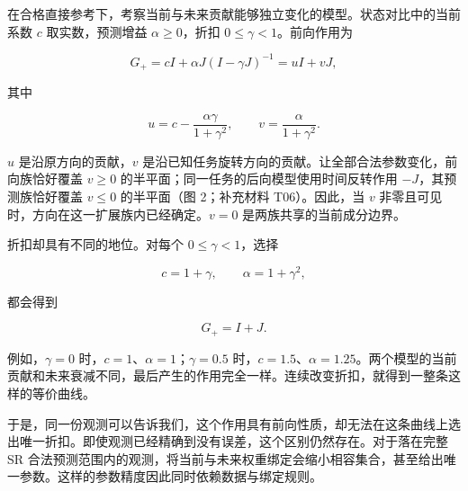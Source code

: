\documentclass[11pt,a4paper]{article}
\begin{document}
\par
\noindent\begin{minipage}{\linewidth}

在合格直接参考下，考察当前与未来贡献能够独立变化的模型。状态对比中的当前系数
\(c\) 取实数，预测增益 \(\alpha\geq0\)，折扣
\(0\leq\gamma<1\)。前向作用为

\[
G_+=cI+\alpha J(I-\gamma J)^{-1}=uI+vJ,
\]

\end{minipage}\par

\par
\noindent\begin{minipage}{\linewidth}

其中

\[
u=c-\frac{\alpha\gamma}{1+\gamma^2},\qquad
v=\frac{\alpha}{1+\gamma^2}.
\]

\end{minipage}\par

\(u\) 是沿原方向的贡献，\(v\)
是沿已知任务旋转方向的贡献。让全部合法参数变化，前向族恰好覆盖
\(v\geq0\) 的半平面；同一任务的后向模型使用时间反转作用
\(-J\)，其预测族恰好覆盖 \(v\leq0\) 的半平面（图 2；补充材料
T06）。因此，当 \(v\) 非零且可见时，方向在这一扩展族内已经确定。\(v=0\)
是两族共享的当前成分边界。

\par
\noindent\begin{minipage}{\linewidth}

折扣却具有不同的地位。对每个 \(0\leq\gamma<1\)，选择

\[
c=1+\gamma,\qquad \alpha=1+\gamma^2,
\]

\end{minipage}\par

\par
\noindent\begin{minipage}{\linewidth}

都会得到

\[
G_+=I+J.
\]

\end{minipage}\par

例如，\(\gamma=0\) 时，\(c=1\)、\(\alpha=1\)；\(\gamma=0.5\)
时，\(c=1.5\)、\(\alpha=1.25\)。两个模型的当前贡献和未来衰减不同，最后产生的作用完全一样。连续改变折扣，就得到一整条这样的等价曲线。

于是，同一份观测可以告诉我们，这个作用具有前向性质，却无法在这条曲线上选出唯一折扣。即使观测已经精确到没有误差，这个区别仍然存在。对于落在完整
SR
合法预测范围内的观测，将当前与未来权重绑定会缩小相容集合，甚至给出唯一参数。这样的参数精度因此同时依赖数据与绑定规则。
\end{document}
